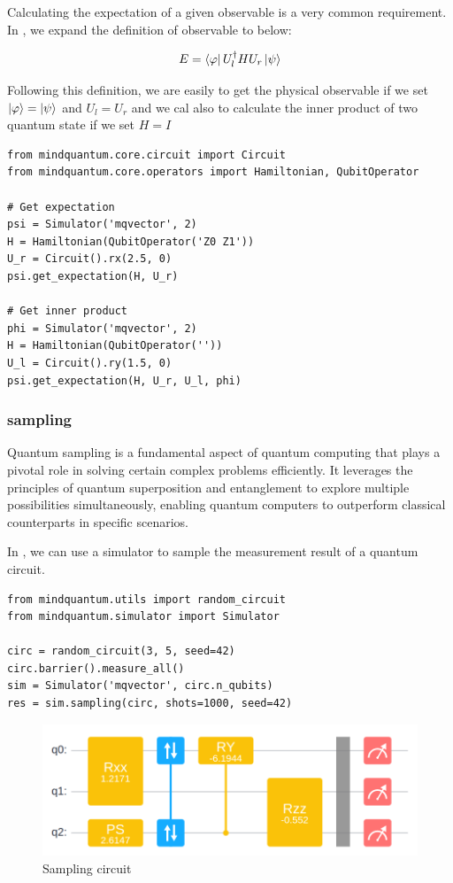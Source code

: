Calculating the expectation of a given observable is a very common requirement. In \MindQuantum, we expand the definition of observable to below:

\begin{equation}
    E = \bra{\varphi}U_l^\dagger H U_r \ket{\psi}
\end{equation}

Following this definition, we are easily to get the physical observable if we set $\ket{\varphi}=\ket{\psi}$ and $U_l = U_r$ and we cal also to calculate the inner product of two quantum state if we set $H=I$

\begin{lstlisting}
from mindquantum.core.circuit import Circuit
from mindquantum.core.operators import Hamiltonian, QubitOperator

# Get expectation
psi = Simulator('mqvector', 2)
H = Hamiltonian(QubitOperator('Z0 Z1'))
U_r = Circuit().rx(2.5, 0)
psi.get_expectation(H, U_r)

# Get inner product
phi = Simulator('mqvector', 2)
H = Hamiltonian(QubitOperator(''))
U_l = Circuit().ry(1.5, 0)
psi.get_expectation(H, U_r, U_l, phi)
\end{lstlisting}

\subsubsection{sampling}

Quantum sampling is a fundamental aspect of quantum computing that plays a pivotal role in solving certain complex problems efficiently. It leverages the principles of quantum superposition and entanglement to explore multiple possibilities simultaneously, enabling quantum computers to outperform classical counterparts in specific scenarios.

In \MindQuantum, we can use a simulator to sample the measurement result of a quantum circuit.
\begin{lstlisting}
from mindquantum.utils import random_circuit
from mindquantum.simulator import Simulator

circ = random_circuit(3, 5, seed=42)
circ.barrier().measure_all()
sim = Simulator('mqvector', circ.n_qubits)
res = sim.sampling(circ, shots=1000, seed=42)
\end{lstlisting}

\begin{figure}[h]
    \begin{center}
        \includegraphics[width=0.9\linewidth]{images/2_6_sampling_circ.png}
    \end{center}
    \caption{Sampling circuit}
\end{figure}

